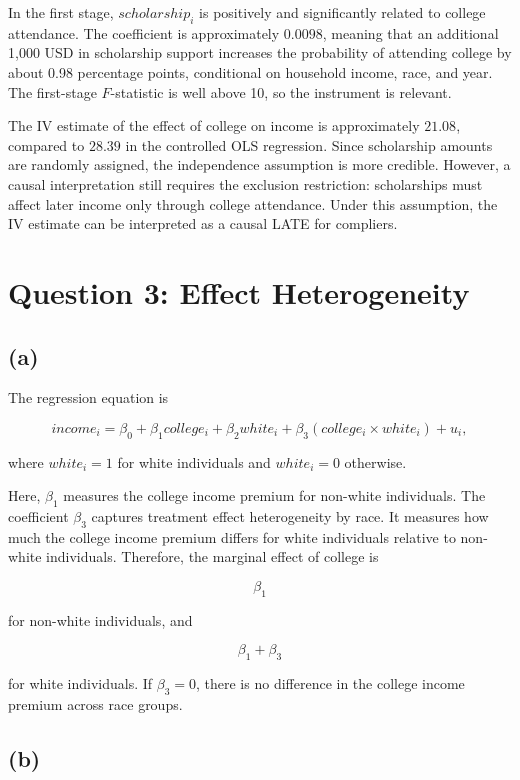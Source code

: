 \documentclass[
]{article}
\begin{document}
In the first stage, \(scholarship_i\) is positively and significantly
related to college attendance. The coefficient is approximately
\(0.0098\), meaning that an additional 1,000 USD in scholarship support
increases the probability of attending college by about 0.98 percentage
points, conditional on household income, race, and year. The first-stage
\(F\)-statistic is well above 10, so the instrument is relevant.

The IV estimate of the effect of college on income is approximately
\(21.08\), compared to \(28.39\) in the controlled OLS regression. Since
scholarship amounts are randomly assigned, the independence assumption
is more credible. However, a causal interpretation still requires the
exclusion restriction: scholarships must affect later income only
through college attendance. Under this assumption, the IV estimate can
be interpreted as a causal LATE for compliers.

\section{Question 3: Effect
Heterogeneity}\label{question-3-effect-heterogeneity}

\subsection{(a)}\label{a-1}

The regression equation is

\[
income_i = \beta_0 + \beta_1 college_i + \beta_2 white_i
+ \beta_3(college_i \times white_i) + u_i,
\]

where \(white_i = 1\) for white individuals and \(white_i = 0\)
otherwise.

Here, \(\beta_1\) measures the college income premium for non-white
individuals. The coefficient \(\beta_3\) captures treatment effect
heterogeneity by race. It measures how much the college income premium
differs for white individuals relative to non-white individuals.
Therefore, the marginal effect of college is

\[
\beta_1
\]

for non-white individuals, and

\[
\beta_1 + \beta_3
\]

for white individuals. If \(\beta_3 = 0\), there is no difference in the
college income premium across race groups.

\subsection{(b)}\label{b-1}
\end{document}
